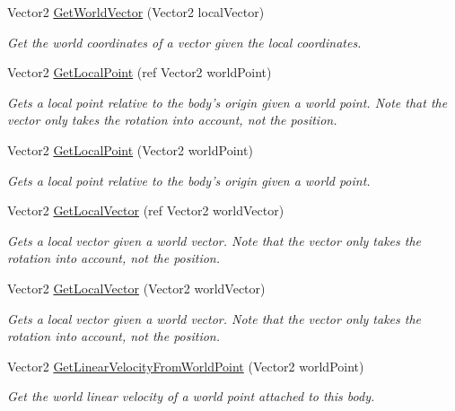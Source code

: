 \begin{DoxyCompactItemize}
Vector2 \hyperlink{class_farseer_physics_1_1_dynamics_1_1_body_a05445a4cba96410c0594dae0234214c4}{Get\+World\+Vector} (Vector2 local\+Vector)
\begin{DoxyCompactList}\small\item\em Get the world coordinates of a vector given the local coordinates. \end{DoxyCompactList}\item 
Vector2 \hyperlink{class_farseer_physics_1_1_dynamics_1_1_body_a95b1bdde1938e7656c156a8aa0de7b46}{Get\+Local\+Point} (ref Vector2 world\+Point)
\begin{DoxyCompactList}\small\item\em Gets a local point relative to the body's origin given a world point. Note that the vector only takes the rotation into account, not the position. \end{DoxyCompactList}\item 
Vector2 \hyperlink{class_farseer_physics_1_1_dynamics_1_1_body_a8584d0c8a7364369d66b4e3d4461f644}{Get\+Local\+Point} (Vector2 world\+Point)
\begin{DoxyCompactList}\small\item\em Gets a local point relative to the body's origin given a world point. \end{DoxyCompactList}\item 
Vector2 \hyperlink{class_farseer_physics_1_1_dynamics_1_1_body_afd3a7f9e83d6f56da292d51c97119565}{Get\+Local\+Vector} (ref Vector2 world\+Vector)
\begin{DoxyCompactList}\small\item\em Gets a local vector given a world vector. Note that the vector only takes the rotation into account, not the position. \end{DoxyCompactList}\item 
Vector2 \hyperlink{class_farseer_physics_1_1_dynamics_1_1_body_a83683973b4430049b1aa37b52cd49246}{Get\+Local\+Vector} (Vector2 world\+Vector)
\begin{DoxyCompactList}\small\item\em Gets a local vector given a world vector. Note that the vector only takes the rotation into account, not the position. \end{DoxyCompactList}\item 
Vector2 \hyperlink{class_farseer_physics_1_1_dynamics_1_1_body_af378fc00f1e0cf6b88b19009b4040021}{Get\+Linear\+Velocity\+From\+World\+Point} (Vector2 world\+Point)
\begin{DoxyCompactList}\small\item\em Get the world linear velocity of a world point attached to this body. \end{DoxyCompactList}\item 

\end{DoxyCompactItemize}
